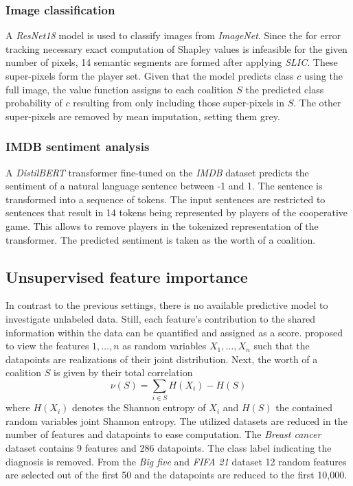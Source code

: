 \subsubsection{Image classification}

A \emph{ResNet18} model is used to classify images from \emph{ImageNet}.
Since the for error tracking necessary exact computation of Shapley values is infeasible for the given number of pixels, 14 semantic segments are formed after applying \emph{SLIC}.
These super-pixels form the player set.
Given that the model predicts class $c$ using the full image, the value function assigns to each coalition $S$ the predicted class probability of $c$ resulting from only including those super-pixels in $S$.
The other super-pixels are removed by mean imputation, setting them grey.

\subsubsection{IMDB sentiment analysis}

A \emph{DistilBERT} transformer  fine-tuned on the \emph{IMDB} dataset predicts the sentiment of a natural language sentence between -1 and 1.
The sentence is transformed into a sequence of tokens.
The input sentences are restricted to sentences that result in 14 tokens being represented by players of the cooperative game.
This allows to remove players in the tokenized representation of the transformer.
The predicted sentiment is taken as the worth of a coalition.


\subsection{Unsupervised feature importance}

In contrast to the previous settings, there is no available predictive model to investigate unlabeled data.
Still, each feature's contribution to the shared information within the data can be quantified and assigned as a score.
\citep{Balestra.2022} proposed to view the features $1,\ldots,n$ as random variables $X_1,\ldots,X_n$ such that the datapoints are realizations of their joint distribution.
Next, the worth of a coalition $S$ is given by their total correlation
\begin{equation*}
    \nu(S) = \sum\limits_{i \in S} H(X_i) - H(S)
\end{equation*}
where $H(X_i)$ denotes the Shannon entropy of $X_i$ and $H(S)$ the contained random variables joint Shannon entropy.
The utilized datasets are reduced in the number of features and datapoints to ease computation.
The \emph{Breast cancer} dataset contains 9 features and 286 datapoints.
The class label indicating the diagnosis is removed.
From the \emph{Big five} and \emph{FIFA 21} dataset 12 random features are selected out of the first 50 and the datapoints are reduced to the first 10,000.